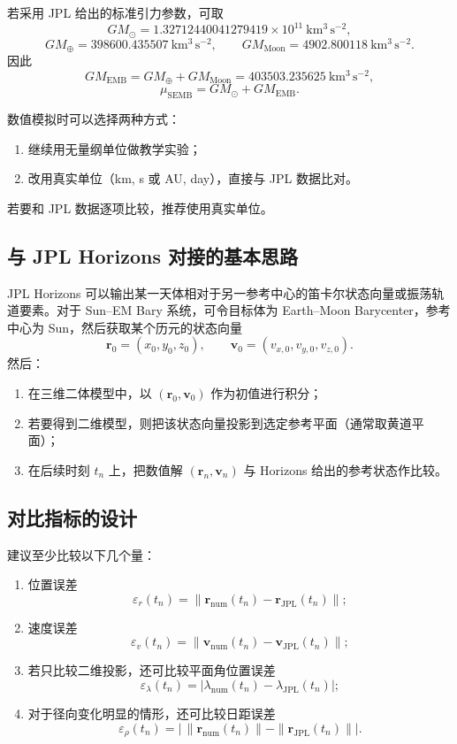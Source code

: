 \documentclass[12pt,a4paper]{ctexrep}
\begin{document}
若采用 JPL 给出的标准引力参数，可取
\[
GM_{\odot}=1.32712440041279419\times 10^{11}\ \mathrm{km^3\,s^{-2}},
\]
\[
GM_{\oplus}=398600.435507\ \mathrm{km^3\,s^{-2}},
\qquad
GM_{\mathrm{Moon}}=4902.800118\ \mathrm{km^3\,s^{-2}}.
\]
因此
\[
GM_{\mathrm{EMB}}=GM_{\oplus}+GM_{\mathrm{Moon}}=403503.235625\ \mathrm{km^3\,s^{-2}},
\]
\[
\mu_{\mathrm{SEMB}}=GM_{\odot}+GM_{\mathrm{EMB}}.
\]

数值模拟时可以选择两种方式：
\begin{enumerate}[label=\arabic*.]
  \item 继续用无量纲单位做教学实验；
  \item 改用真实单位（km, s 或 AU, day），直接与 JPL 数据比对。
\end{enumerate}
若要和 JPL 数据逐项比较，推荐使用真实单位。

\subsection{与 JPL Horizons 对接的基本思路}

JPL Horizons 可以输出某一天体相对于另一参考中心的笛卡尔状态向量或振荡轨道要素。对于 Sun--EM Bary 系统，可令目标体为 Earth--Moon Barycenter，参考中心为 Sun，然后获取某个历元的状态向量
\[
\bm r_0=(x_0,y_0,z_0),
\qquad
\bm v_0=(v_{x,0},v_{y,0},v_{z,0}).
\]
然后：
\begin{enumerate}[label=\arabic*.]
  \item 在三维二体模型中，以 \((\bm r_0,\bm v_0)\) 作为初值进行积分；
  \item 若要得到二维模型，则把该状态向量投影到选定参考平面（通常取黄道平面）；
  \item 在后续时刻 \(t_n\) 上，把数值解 \((\bm r_n,\bm v_n)\) 与 Horizons 给出的参考状态作比较。
\end{enumerate}

\subsection{对比指标的设计}

建议至少比较以下几个量：
\begin{enumerate}[label=\arabic*.]
  \item 位置误差
  \[
  \varepsilon_r(t_n)=\|\bm r_{\mathrm{num}}(t_n)-\bm r_{\mathrm{JPL}}(t_n)\|;
  \]
  \item 速度误差
  \[
  \varepsilon_v(t_n)=\|\bm v_{\mathrm{num}}(t_n)-\bm v_{\mathrm{JPL}}(t_n)\|;
  \]
  \item 若只比较二维投影，还可比较平面角位置误差
  \[
  \varepsilon_\lambda(t_n)=|\lambda_{\mathrm{num}}(t_n)-\lambda_{\mathrm{JPL}}(t_n)|;
  \]
  \item 对于径向变化明显的情形，还可比较日距误差
  \[
  \varepsilon_\rho(t_n)=\left|\,\|\bm r_{\mathrm{num}}(t_n)\|-\|\bm r_{\mathrm{JPL}}(t_n)\|\right|.
  \]
\end{enumerate}
\end{document}
